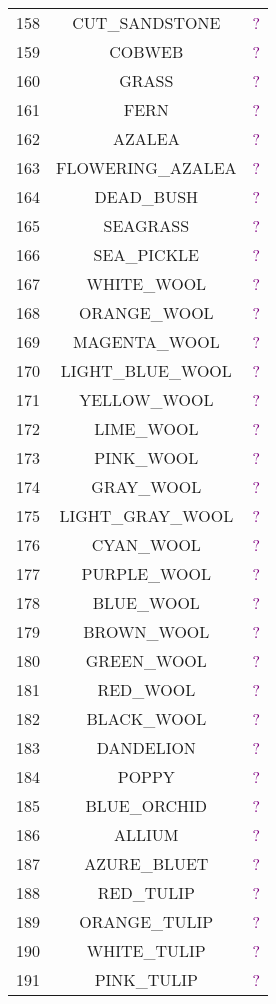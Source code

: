 \documentclass[11pt]{article}
\newcommand\myworries[1]{\textcolor{purple}{#1}}
\begin{document}
\begin{longtable}{ |c|c|c| }
	158 & CUT\_SANDSTONE & \myworries{?} \\
	159 & COBWEB & \myworries{?} \\
	160 & GRASS & \myworries{?} \\
	161 & FERN & \myworries{?} \\
	162 & AZALEA & \myworries{?} \\
	163 & FLOWERING\_AZALEA & \myworries{?} \\
	164 & DEAD\_BUSH & \myworries{?} \\
	165 & SEAGRASS & \myworries{?} \\
	166 & SEA\_PICKLE & \myworries{?} \\
	167 & WHITE\_WOOL & \myworries{?} \\
	168 & ORANGE\_WOOL & \myworries{?} \\
	169 & MAGENTA\_WOOL & \myworries{?} \\
	170 & LIGHT\_BLUE\_WOOL & \myworries{?} \\
	171 & YELLOW\_WOOL & \myworries{?} \\
	172 & LIME\_WOOL & \myworries{?} \\
	173 & PINK\_WOOL & \myworries{?} \\
	174 & GRAY\_WOOL & \myworries{?} \\
	175 & LIGHT\_GRAY\_WOOL & \myworries{?} \\
	176 & CYAN\_WOOL & \myworries{?} \\
	177 & PURPLE\_WOOL & \myworries{?} \\
	178 & BLUE\_WOOL & \myworries{?} \\
	179 & BROWN\_WOOL & \myworries{?} \\
	180 & GREEN\_WOOL & \myworries{?} \\
	181 & RED\_WOOL & \myworries{?} \\
	182 & BLACK\_WOOL & \myworries{?} \\
	183 & DANDELION & \myworries{?} \\
	184 & POPPY & \myworries{?} \\
	185 & BLUE\_ORCHID & \myworries{?} \\
	186 & ALLIUM & \myworries{?} \\
	187 & AZURE\_BLUET & \myworries{?} \\
	188 & RED\_TULIP & \myworries{?} \\
	189 & ORANGE\_TULIP & \myworries{?} \\
	190 & WHITE\_TULIP & \myworries{?} \\
	191 & PINK\_TULIP & \myworries{?} \\

\end{longtable}
\end{document}
